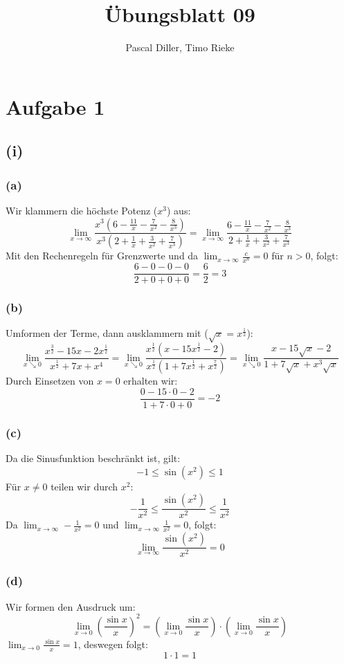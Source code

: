 \documentclass{article}
\title{Übungsblatt 09}
\author{Pascal Diller, Timo Rieke}
\begin{document}
\maketitle
\section*{Aufgabe 1}
\subsection*{(i)}
\subsubsection*{(a)}
Wir klammern die höchste Potenz (\(x^3\)) aus:
\[\lim_{x\to\infty} \frac{x^3(6 - \frac{11}{x} - \frac{7}{x^2} - \frac{8}{x^3})}{x^3(2 + \frac{1}{x} + \frac{3}{x^2} + \frac{7}{x^3})} = \lim_{x\to\infty} \frac{6 - \frac{11}{x} - \frac{7}{x^2} - \frac{8}{x^3}}{2 + \frac{1}{x} + \frac{3}{x^2} + \frac{7}{x^3}}\]
Mit den Rechenregeln für Grenzwerte und da \(\lim_{x\to\infty} \frac{c}{x^n} = 0\) für \(n>0\), folgt:
\[\frac{6 - 0 - 0 - 0}{2 + 0 + 0 + 0} = \frac{6}{2} = 3\]

\subsubsection*{(b)}
Umformen der Terme, dann ausklammern mit (\(\sqrt{x} = x^{\frac{1}{2}}\)):
\[\lim_{x\searrow0} \frac{x^{\frac{3}{2}} - 15x - 2x^{\frac{1}{2}}}{x^{\frac{1}{2}} + 7x + x^4} = \lim_{x\searrow0} \frac{x^{\frac{1}{2}}(x - 15x^{\frac{1}{2}} - 2)}{x^{\frac{1}{2}}(1 + 7x^{\frac{1}{2}} + x^{\frac{7}{2}})} = \lim_{x\searrow0} \frac{x - 15\sqrt{x} - 2}{1 + 7\sqrt{x} + x^3\sqrt{x}}\]
Durch Einsetzen von \(x=0\) erhalten wir:
\[\frac{0 - 15\cdot0 - 2}{1 + 7\cdot0 + 0} = -2\]

\subsubsection*{(c)}
Da die Sinusfunktion beschränkt ist, gilt:
\[-1 \le \sin(x^2) \le 1\]
Für \(x \ne 0\) teilen wir durch \( x^2 \):
\[-\frac{1}{x^2} \le \frac{\sin(x^2)}{x^2} \le \frac{1}{x^2}\]
Da \(\lim_{x\to\infty} -\frac{1}{x^2} = 0\) und \(\lim_{x\to\infty} \frac{1}{x^2} = 0\), folgt:
\[\lim_{x\to\infty} \frac{\sin(x^2)}{x^2} = 0\]

\subsubsection*{(d)}
Wir formen den Ausdruck um:
\[\lim_{x\to0} \left(\frac{\sin x}{x}\right)^2 = \left(\lim_{x\to0} \frac{\sin x}{x}\right) \cdot \left(\lim_{x\to0} \frac{\sin x}{x}\right)\]
\(\lim_{x\to0} \frac{\sin x}{x} = 1\), deswegen folgt:
\[1 \cdot 1 = 1\]
\end{document}
